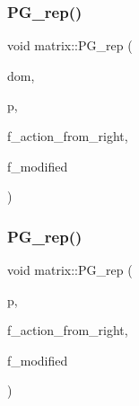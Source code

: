 \mbox{\label{classmatrix_a2b77483722eaba5108902dbbb96fc986}} 
\subsubsection{\texorpdfstring{P\+G\+\_\+rep()}{PG\_rep()}\hspace{0.1cm}{\footnotesize\ttfamily [1/2]}}
{\footnotesize\ttfamily void matrix\+::\+P\+G\+\_\+rep (\begin{DoxyParamCaption}\item[{\mbox{\hyperlink{classdomain}{domain}} $\ast$}]{dom,  }\item[{\mbox{\hyperlink{classpermutation}{permutation}} \&}]{p,  }\item[{\mbox{\hyperlink{galois_8h_a09fddde158a3a20bd2dcadb609de11dc}{I\+NT}}}]{f\+\_\+action\+\_\+from\+\_\+right,  }\item[{\mbox{\hyperlink{galois_8h_a09fddde158a3a20bd2dcadb609de11dc}{I\+NT}}}]{f\+\_\+modified }\end{DoxyParamCaption})}

\mbox{\label{classmatrix_af084532cc1d1b518ac2a6e7de1da3fa5}} 
\subsubsection{\texorpdfstring{P\+G\+\_\+rep()}{PG\_rep()}\hspace{0.1cm}{\footnotesize\ttfamily [2/2]}}
{\footnotesize\ttfamily void matrix\+::\+P\+G\+\_\+rep (\begin{DoxyParamCaption}\item[{\mbox{\hyperlink{classpermutation}{permutation}} \&}]{p,  }\item[{\mbox{\hyperlink{galois_8h_a09fddde158a3a20bd2dcadb609de11dc}{I\+NT}}}]{f\+\_\+action\+\_\+from\+\_\+right,  }\item[{\mbox{\hyperlink{galois_8h_a09fddde158a3a20bd2dcadb609de11dc}{I\+NT}}}]{f\+\_\+modified }\end{DoxyParamCaption})}

\mbox{\label{classmatrix_a7c9caac34a30994119cd7048df71df6e}} 

